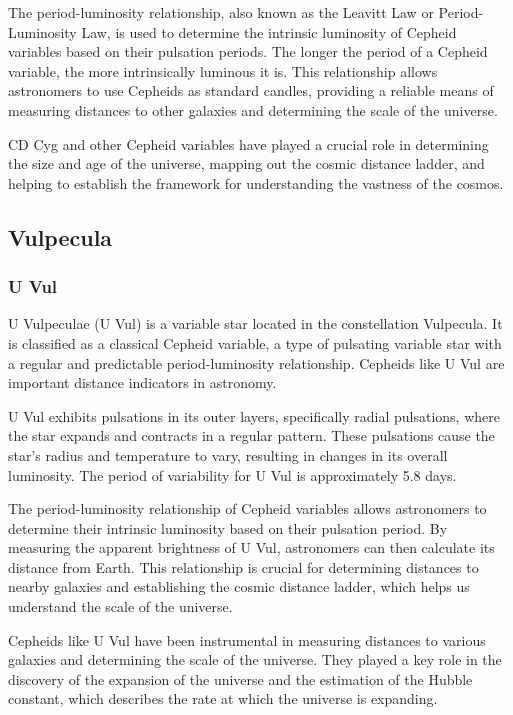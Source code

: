 The period-luminosity relationship, also known as the Leavitt Law or Period-Luminosity Law, is used to determine the intrinsic luminosity of Cepheid variables based on their pulsation periods. The longer the period of a Cepheid variable, the more intrinsically luminous it is. This relationship allows astronomers to use Cepheids as standard candles, providing a reliable means of measuring distances to other galaxies and determining the scale of the universe.

CD Cyg and other Cepheid variables have played a crucial role in determining the size and age of the universe, mapping out the cosmic distance ladder, and helping to establish the framework for understanding the vastness of the cosmos.

\subsection{Vulpecula}

\subsubsection*{ U Vul }
U Vulpeculae (U Vul) is a variable star located in the constellation Vulpecula. It is classified as a classical Cepheid variable, a type of pulsating variable star with a regular and predictable period-luminosity relationship. Cepheids like U Vul are important distance indicators in astronomy.

U Vul exhibits pulsations in its outer layers, specifically radial pulsations, where the star expands and contracts in a regular pattern. These pulsations cause the star's radius and temperature to vary, resulting in changes in its overall luminosity. The period of variability for U Vul is approximately 5.8 days.

The period-luminosity relationship of Cepheid variables allows astronomers to determine their intrinsic luminosity based on their pulsation period. By measuring the apparent brightness of U Vul, astronomers can then calculate its distance from Earth. This relationship is crucial for determining distances to nearby galaxies and establishing the cosmic distance ladder, which helps us understand the scale of the universe.

Cepheids like U Vul have been instrumental in measuring distances to various galaxies and determining the scale of the universe. They played a key role in the discovery of the expansion of the universe and the estimation of the Hubble constant, which describes the rate at which the universe is expanding.

